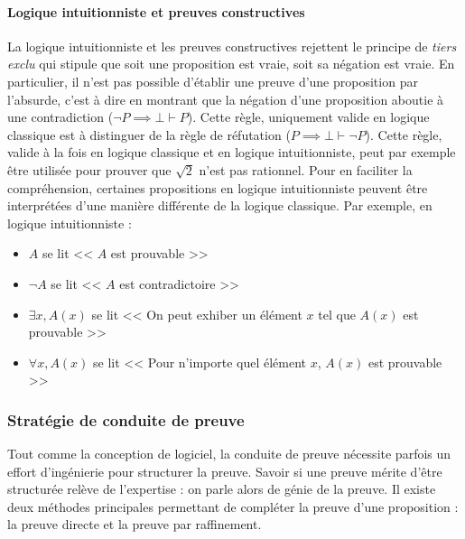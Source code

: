 			\paragraph{Logique intuitionniste et preuves constructives} La logique intuitionniste et les preuves constructives rejettent le principe de \emph{tiers exclu} qui stipule que soit une proposition est vraie, soit sa négation est vraie. En particulier, il n'est pas possible d'établir une preuve d'une proposition par l'absurde, c'est à dire en montrant que la négation d'une proposition aboutie à une contradiction ($ \neg P \implies \bot \vdash P$). Cette règle, uniquement valide en logique classique est à distinguer de la règle de réfutation ($P \implies \bot \vdash \neg P$). Cette règle, valide à la fois en logique classique et en logique intuitionniste, peut par exemple être utilisée pour prouver que $\sqrt{2}$ n'est pas rationnel.
			Pour en faciliter la compréhension, certaines propositions en logique intuitionniste peuvent être interprétées d'une manière différente de la logique classique. Par exemple, en logique intuitionniste :
			\begin{itemize}
				\item{$A$ se lit << $A$ est prouvable >>}
				\item{$\neg A$ se lit << $A$ est contradictoire >>}
				\item{$\exists x, A(x)$ se lit << On peut exhiber un élément $x$ tel que $A(x)$ est prouvable >>}
				\item{$\forall x, A(x)$ se lit << Pour n'importe quel élément $x$, $A(x)$ est prouvable >>}
			\end{itemize}



			\subsubsection{Stratégie de conduite de preuve}
			Tout comme la conception de logiciel, la conduite de preuve nécessite parfois un effort d'ingénierie pour structurer la preuve. Savoir si une preuve mérite d'être structurée relève  de l'expertise : on parle alors de génie de la preuve. Il existe deux méthodes principales permettant de compléter la preuve d'une proposition : la preuve directe et la preuve par raffinement.

